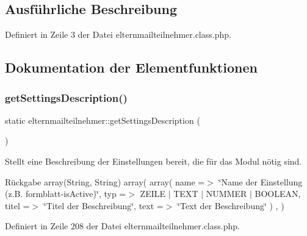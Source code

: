 \subsection{Ausführliche Beschreibung}


Definiert in Zeile 3 der Datei elternmailteilnehmer.\+class.\+php.



\subsection{Dokumentation der Elementfunktionen}
\mbox{\label{classelternmailteilnehmer_a01251c82b8dc0f5f53890ab778b5e65f}} 
\subsubsection{\texorpdfstring{get\+Settings\+Description()}{getSettingsDescription()}}
{\footnotesize\ttfamily static elternmailteilnehmer\+::get\+Settings\+Description (\begin{DoxyParamCaption}{ }\end{DoxyParamCaption})\hspace{0.3cm}{\ttfamily [static]}}

Stellt eine Beschreibung der Einstellungen bereit, die für das Modul nötig sind. \begin{DoxyReturn}{Rückgabe}
array(\+String, String) array( array( \textquotesingle{}name\textquotesingle{} =$>$ \char`\"{}\+Name der Einstellung (z.\+B. formblatt-\/is\+Active)\char`\"{}, \textquotesingle{}typ\textquotesingle{} =$>$ Z\+E\+I\+LE $\vert$ T\+E\+XT $\vert$ N\+U\+M\+M\+ER $\vert$ B\+O\+O\+L\+E\+AN, \textquotesingle{}titel\textquotesingle{} =$>$ \char`\"{}\+Titel der Beschreibung\char`\"{}, \textquotesingle{}text\textquotesingle{} =$>$ \char`\"{}\+Text der Beschreibung\char`\"{} ) , ) 
\end{DoxyReturn}


Definiert in Zeile 208 der Datei elternmailteilnehmer.\+class.\+php.

\mbox{\label{classelternmailteilnehmer_a4da8930163b44e21e624888c9c9d14b5}} 
